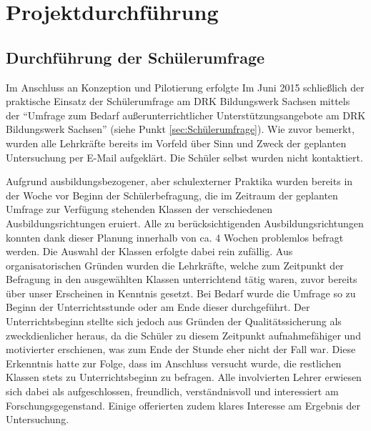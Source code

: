 \section{Projektdurchführung}
\label{sec:Projektdurchführung}

\subsection{Durchführung der Schülerumfrage}
\label{sec:DurchführungDerSchülerumfrage}

Im Anschluss an Konzeption und Pilotierung erfolgte Im Juni 2015 schließlich der praktische Einsatz der Schülerumfrage am DRK Bildungswerk Sachsen mittels der "`Umfrage zum Bedarf außerunterrichtlicher Unterstützungsangebote am DRK Bildungswerk Sachsen"' (siehe Punkt \ref{sec:Schülerumfrage}). Wie zuvor bemerkt, wurden alle Lehrkräfte bereits im Vorfeld über Sinn und Zweck der geplanten Untersuchung per E-Mail aufgeklärt. Die Schüler selbst wurden nicht kontaktiert. 

Aufgrund ausbildungsbezogener, aber schulexterner Praktika wurden bereits in der Woche vor Beginn der Schülerbefragung, die im Zeitraum der geplanten Umfrage zur Verfügung stehenden Klassen der verschiedenen Ausbildungsrichtungen eruiert. Alle zu berücksichtigenden Ausbildungsrichtungen konnten dank dieser Planung innerhalb von ca. 4 Wochen problemlos befragt werden. Die Auswahl der Klassen erfolgte dabei rein zufällig. Aus organisatorischen Gründen wurden die Lehrkräfte, welche zum Zeitpunkt der Befragung in den ausgewählten Klassen unterrichtend tätig waren, zuvor bereits über unser Erscheinen in Kenntnis gesetzt. Bei Bedarf wurde die Umfrage so zu Beginn der Unterrichtsstunde oder am Ende dieser durchgeführt. Der Unterrichtsbeginn stellte sich jedoch aus Gründen der Qualitätssicherung als zweckdienlicher heraus, da die Schüler zu diesem Zeitpunkt aufnahmefähiger und motivierter erschienen, was zum Ende der Stunde eher nicht der Fall war. Diese Erkenntnis hatte zur Folge, dass im Anschluss versucht wurde, die restlichen Klassen stets zu Unterrichtsbeginn zu befragen. Alle involvierten Lehrer erwiesen sich dabei als aufgeschlossen, freundlich, verständnisvoll und interessiert am Forschungsgegenstand.  Einige offerierten zudem klares Interesse am Ergebnis der Untersuchung. 

